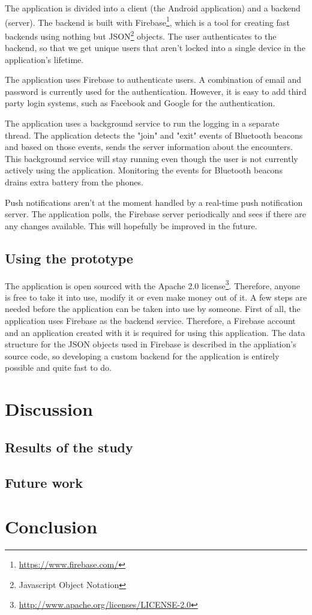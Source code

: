 The application is divided into a client (the Android application) and a backend (server). The backend is built with Firebase\footnote{\url{https://www.firebase.com/}}, which is a tool for creating fast backends using nothing but JSON\footnote{Javascript Object Notation} objects. The user authenticates to the backend, so that we get unique users that aren't locked into a single device in the application's lifetime.

The application uses Firebase to authenticate users. A combination of email and password is currently used for the authentication. However, it is easy to add third party login systems, such as Facebook and Google for the authentication.

The application uses a background service to run the logging in a separate thread. The application detects the "join" and "exit" events of Bluetooth beacons and based on those events, sends the server information about the encounters. This background service will stay running even though the user is not currently actively using the application. Monitoring the events for Bluetooth beacons drains extra battery from the phones.

Push notifications aren't at the moment handled by a real-time push notification server. The application polls, the Firebase server periodically and sees if there are any changes available. This will hopefully be improved in the future.

\subsection{Using the prototype}

The application is open sourced with the Apache 2.0 license\footnote{\url{http://www.apache.org/licenses/LICENSE-2.0}}. Therefore, anyone is free to take it into use, modify it or even make money out of it. A few steps are needed before the application can be taken into use by someone. First of all, the application uses Firebase as the backend service. Therefore, a Firebase account and an application created with it is required for using this application. The data structure for the JSON objects used in Firebase is described in the appliation's source code, so developing a custom backend for the application is entirely possible and quite fast to do.

\section{Discussion}

\subsection{Results of the study}

\subsection{Future work}

\section{Conclusion}

